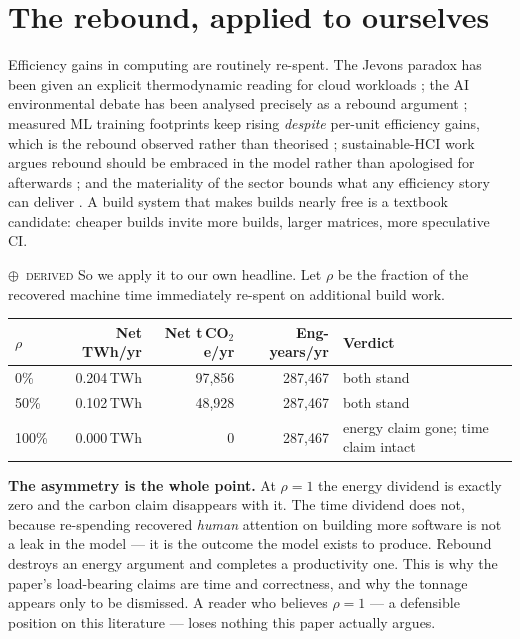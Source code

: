 \documentclass[11pt,a4paper]{article}
\providecommand{\textcite}[1]{\cite{#1}}
\newcommand{\stD}{\textcolor{sigilviolet}{$\oplus$}~{\scriptsize\textsc{derived}}}
\begin{document}
\section{The rebound, applied to ourselves}\label{sec:rebound}


Efficiency gains in computing are routinely re-spent. The Jevons paradox has been given an explicit thermodynamic reading for cloud workloads \textcite{arxiv2411_11540}; the AI environmental debate has been analysed precisely as a rebound argument \textcite{arxiv2501_16548}; measured ML training footprints keep rising \emph{despite} per-unit efficiency gains, which is the rebound observed rather than theorised \textcite{arxiv2510_09022}; sustainable-HCI work argues rebound should be embraced in the model rather than apologised for afterwards \textcite{arxiv2506_14653}; and the materiality of the sector bounds what any efficiency story can deliver \textcite{arxiv2507_19287}. A build system that makes builds nearly free is a textbook candidate: cheaper builds invite more builds, larger matrices, more speculative CI.


\stD{} So we apply it to our own headline. Let $\rho$ be the fraction of the recovered machine time immediately re-spent on additional build work.

\begin{center}\small{}\begin{tabularx}{\textwidth}{@{}lrrrX@{}}\toprule
$\rho$ & Net TWh/yr & Net t\,CO$_2$e/yr & Eng-years/yr & Verdict \\\midrule
0\% & 0.204\,TWh & 97{,}856 & 287{,}467 & both stand \\
50\% & 0.102\,TWh & 48{,}928 & 287{,}467 & both stand \\
100\% & 0.000\,TWh & 0 & 287{,}467 & energy claim gone; time claim intact \\
\bottomrule\end{tabularx}\end{center}


\textbf{The asymmetry is the whole point.} At $\rho=1$ the energy dividend is exactly zero and the carbon claim disappears with it. The time dividend does not, because re-spending recovered \emph{human} attention on building more software is not a leak in the model --- it is the outcome the model exists to produce. Rebound destroys an energy argument and completes a productivity one. This is why the paper's load-bearing claims are time and correctness, and why the tonnage appears only to be dismissed. A reader who believes $\rho=1$ --- a defensible position on this literature --- loses nothing this paper actually argues.
\end{document}
